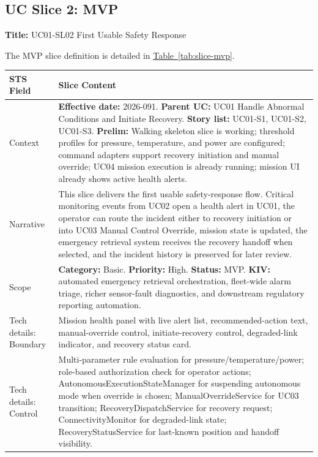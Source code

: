 \documentclass[10pt,a4paper]{article}
\let\orighyperref\hyperref
\renewcommand{\hyperref}[2][]{\orighyperref[#1]{\uline{#2}}}
\begin{document}
\subsection*{UC Slice 2: MVP}
{}
\label{sec:uc-slice-mvp}

\textbf{Title:} UC01-SL02 First Usable Safety Response

The MVP slice definition is detailed in \hyperref[tab:slice-mvp]{Table~\ref*{tab:slice-mvp}}.

\begin{table}[H]
\centering
\small
\renewcommand{\arraystretch}{1.15}
\begin{tabularx}{\textwidth}{|P{0.22\textwidth}|Y|}
\hline
{}
\textbf{STS Field} & \textbf{Slice Content} \\
\hline
Context & \textbf{Effective date:} 2026-091. \textbf{Parent UC:} UC01 Handle Abnormal Conditions and Initiate Recovery. \textbf{Story list:} UC01-S1, UC01-S2, UC01-S3. \textbf{Prelim:} Walking skeleton slice is working; threshold profiles for pressure, temperature, and power are configured; command adapters support recovery initiation and manual override; UC04 mission execution is already running; mission UI already shows active health alerts. \\
\hline
Narrative & This slice delivers the first usable safety-response flow. Critical monitoring events from UC02 open a health alert in UC01, the operator can route the incident either to recovery initiation or into UC03 Manual Control Override, mission state is updated, the emergency retrieval system receives the recovery handoff when selected, and the incident history is preserved for later review. \\
\hline
Scope & \textbf{Category:} Basic. \textbf{Priority:} High. \textbf{Status:} MVP. \textbf{KIV:} automated emergency retrieval orchestration, fleet-wide alarm triage, richer sensor-fault diagnostics, and downstream regulatory reporting automation. \\
\hline
Tech details: Boundary & Mission health panel with live alert list, recommended-action text, manual-override control, initiate-recovery control, degraded-link indicator, and recovery status card. \\
\hline
Tech details: Control & Multi-parameter rule evaluation for pressure/temperature/power; role-based authorization check for operator actions; AutonomousExecutionStateManager for suspending autonomous mode when override is chosen; ManualOverrideService for UC03 transition; RecoveryDispatchService for recovery request; ConnectivityMonitor for degraded-link state; RecoveryStatusService for last-known position and handoff visibility. \\

\end{tabularx}
\end{table}
\end{document}
